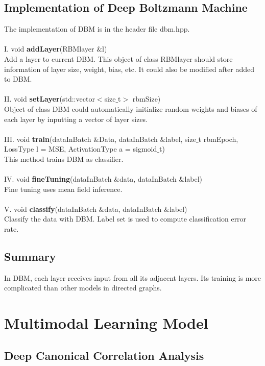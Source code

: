 \documentclass[12pt]{article}
\begin{document}
\subsection{Implementation of Deep Boltzmann Machine}
The implementation of DBM is in the header file dbm.hpp.\\
\\
I. void \textbf{addLayer}(RBMlayer $\&$l)\\
Add a layer to current DBM. This object of class RBMlayer should store information of layer size, weight, bias, etc. It could also be modified after added to DBM.\\
\\
II. void \textbf{setLayer}(std::vector$<$size$\_$t$>$ rbmSize)\\
Object of class DBM could automatically initialize random weights and biases of each layer by inputting a vector of layer sizes.\\
\\
III. void \textbf{train}(dataInBatch $\&$Data, dataInBatch $\&$label, size$\_$t rbmEpoch, LossType l = MSE, ActivationType a = sigmoid$\_$t)\\
This method trains DBM as classifier.\\
\\
IV. void \textbf{fineTuning}(dataInBatch $\&$data, dataInBatch $\&$label)\\
Fine tuning uses mean field inference.\\
\\
V. void \textbf{classify}(dataInBatch $\&$data, dataInBatch $\&$label)\\
Classify the data with DBM. Label set is used to compute classification error rate.
\subsection{Summary}
In DBM, each layer receives input from all its adjacent layers. Its training is more complicated than other models in directed graphs.
\clearpage
\section{Multimodal Learning Model}
\subsection{Deep Canonical Correlation Analysis}
\end{document}
